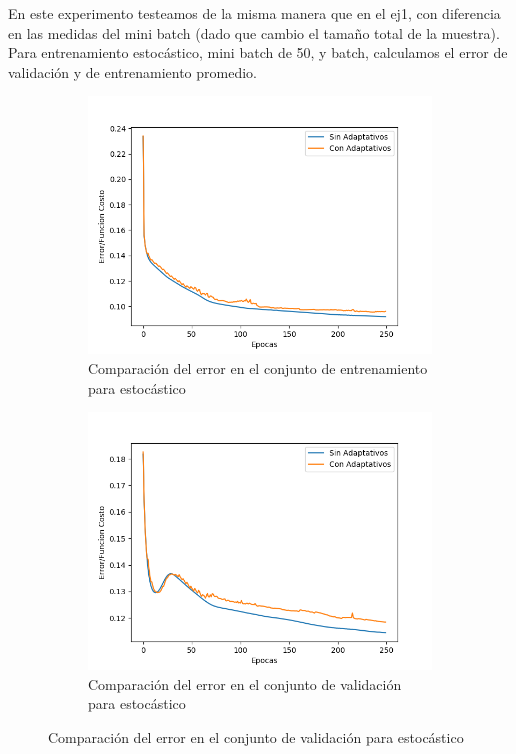 En este experimento testeamos de la misma manera que en el ej1, con diferencia en las medidas del mini batch (dado que cambio el tamaño total de la muestra). 
Para entrenamiento estocástico, mini batch de 50, y batch, calculamos el error de validación y de entrenamiento promedio.

\begin{figure}[!htbp]
\centering
\begin{subfigure}{.5\textwidth}
  \centering
  \includegraphics[width=1\linewidth]{graficos/ej2/adaptativos_promedios_entrenamiento_1.png}
  \caption{Comparación del error en el conjunto de entrenamiento para estocástico}
  \label{fig:sub1}
\end{subfigure}%
\begin{subfigure}{.5\textwidth}
  \centering
  \includegraphics[width=1\linewidth]{graficos/ej2/adaptativos_promedios_validacion_1.png}
  \caption{Comparación del error en el conjunto de validación para estocástico}
  \label{fig:sub2}
\end{subfigure}
\end{figure}

